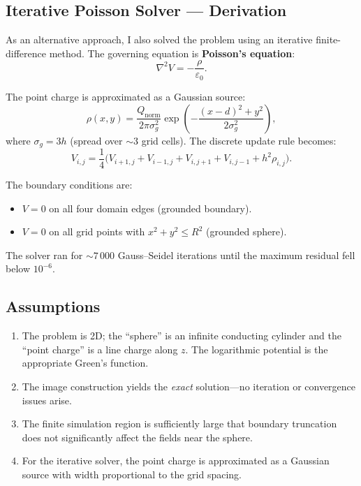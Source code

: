 \documentclass[11pt,a4paper]{article}
\begin{document}
\subsection{Iterative Poisson Solver --- Derivation}

As an alternative approach, I also solved the problem using an iterative finite-difference method. The governing equation is \textbf{Poisson's equation}:
\begin{equation}
\nabla^2 V = -\frac{\rho}{\varepsilon_0}.
\end{equation}

The point charge is approximated as a Gaussian source:
\begin{equation}
\rho(x,y) = \frac{Q_{\text{norm}}}{2\pi\sigma_g^2}\exp\!\left(-\frac{(x-d)^2 + y^2}{2\sigma_g^2}\right),
\end{equation}
where $\sigma_g = 3h$ (spread over ${\sim}3$ grid cells). The discrete update rule becomes:
\begin{equation}
\boxed{\;V_{i,j} = \frac{1}{4}\bigl(V_{i+1,j} + V_{i-1,j} + V_{i,j+1} + V_{i,j-1} + h^2 \rho_{i,j}\bigr).\;}
\label{eq:poisson_update}
\end{equation}

The boundary conditions are:
\begin{itemize}[leftmargin=2em]
\item $V = 0$ on all four domain edges (grounded boundary).
\item $V = 0$ on all grid points with $x^2 + y^2 \le R^2$ (grounded sphere).
\end{itemize}

The solver ran for ${\sim}7\,000$ Gauss--Seidel iterations until the maximum residual fell below $10^{-6}$.

\subsection{Assumptions}
\begin{enumerate}[leftmargin=2em]
\item The problem is 2D; the ``sphere'' is an infinite conducting cylinder and the ``point charge'' is a line charge along $z$. The logarithmic potential is the appropriate Green's function.
\item The image construction yields the \emph{exact} solution---no iteration or convergence issues arise.
\item The finite simulation region is sufficiently large that boundary truncation does not significantly affect the fields near the sphere.
\item For the iterative solver, the point charge is approximated as a Gaussian source with width proportional to the grid spacing.
\end{enumerate}
\end{document}
